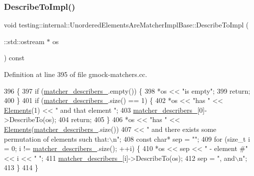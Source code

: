 \subsubsection{\texorpdfstring{Describe\+To\+Impl()}{DescribeToImpl()}}
{\footnotesize\ttfamily void testing\+::internal\+::\+Unordered\+Elements\+Are\+Matcher\+Impl\+Base\+::\+Describe\+To\+Impl (\begin{DoxyParamCaption}\item[{\+::std\+::ostream $\ast$}]{os }\end{DoxyParamCaption}) const\hspace{0.3cm}{\ttfamily [protected]}}



Definition at line 395 of file gmock-\/matchers.\+cc.


\begin{DoxyCode}
396                           \{
397   \textcolor{keywordflow}{if} (\hyperlink{classtesting_1_1internal_1_1UnorderedElementsAreMatcherImplBase_af416e45f53ebdfe4bccd710142db1600}{matcher\_describers\_}.empty()) \{
398     *os << \textcolor{stringliteral}{"is empty"};
399     \textcolor{keywordflow}{return};
400   \}
401   \textcolor{keywordflow}{if} (\hyperlink{classtesting_1_1internal_1_1UnorderedElementsAreMatcherImplBase_af416e45f53ebdfe4bccd710142db1600}{matcher\_describers\_}.size() == 1) \{
402     *os << \textcolor{stringliteral}{"has "} << \hyperlink{classtesting_1_1internal_1_1UnorderedElementsAreMatcherImplBase_ab6d5a2342e07730b913f419cf662d16a}{Elements}(1) << \textcolor{stringliteral}{" and that element "};
403     \hyperlink{classtesting_1_1internal_1_1UnorderedElementsAreMatcherImplBase_af416e45f53ebdfe4bccd710142db1600}{matcher\_describers\_}[0]->DescribeTo(os);
404     \textcolor{keywordflow}{return};
405   \}
406   *os << \textcolor{stringliteral}{"has "} << \hyperlink{classtesting_1_1internal_1_1UnorderedElementsAreMatcherImplBase_ab6d5a2342e07730b913f419cf662d16a}{Elements}(\hyperlink{classtesting_1_1internal_1_1UnorderedElementsAreMatcherImplBase_af416e45f53ebdfe4bccd710142db1600}{matcher\_describers\_}.size())
407       << \textcolor{stringliteral}{" and there exists some permutation of elements such that:\(\backslash\)n"};
408   \textcolor{keyword}{const} \textcolor{keywordtype}{char}* sep = \textcolor{stringliteral}{""};
409   \textcolor{keywordflow}{for} (\textcolor{keywordtype}{size\_t} i = 0; i != \hyperlink{classtesting_1_1internal_1_1UnorderedElementsAreMatcherImplBase_af416e45f53ebdfe4bccd710142db1600}{matcher\_describers\_}.size(); ++i) \{
410     *os << sep << \textcolor{stringliteral}{" - element #"} << i << \textcolor{stringliteral}{" "};
411     \hyperlink{classtesting_1_1internal_1_1UnorderedElementsAreMatcherImplBase_af416e45f53ebdfe4bccd710142db1600}{matcher\_describers\_}[i]->DescribeTo(os);
412     sep = \textcolor{stringliteral}{", and\(\backslash\)n"};
413   \}
414 \}
\end{DoxyCode}
